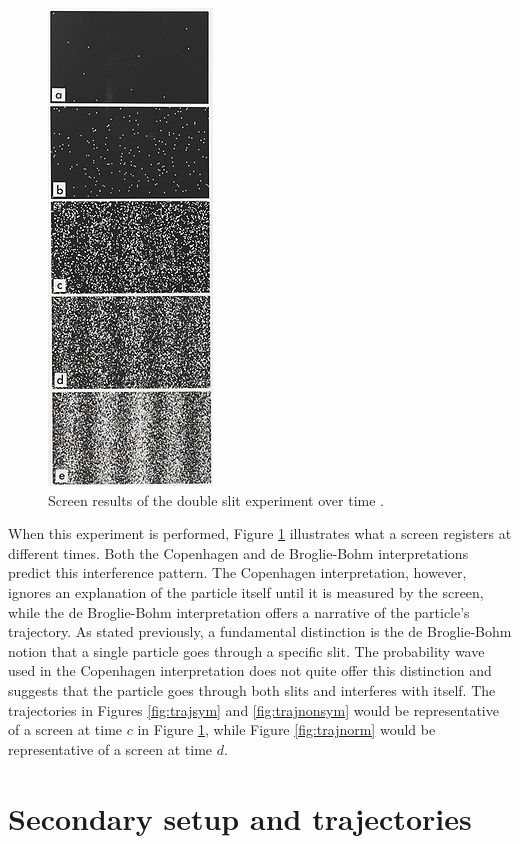 \documentclass[10pt, reqno]{article}
\begin{document}
  \begin{figure}
    \centerline{\includegraphics[scale=4.5]{./imgs/double-slit-results.jpg}}
    \caption{
    Screen results of the double slit experiment over time \cite{wiki}.
    }
    \label{fig:double-slit-results}
  \end{figure}

  When this experiment is performed, Figure \ref{fig:double-slit-results} illustrates what a screen registers at different times.
  Both the Copenhagen and de Broglie-Bohm interpretations predict this interference pattern.
  The Copenhagen interpretation, however, ignores an explanation of the particle itself until it is measured by the screen, 
    while the de Broglie-Bohm interpretation offers a narrative of the particle's trajectory.
  As stated previously, a fundamental distinction is the de Broglie-Bohm notion that a single particle goes through a specific slit.
  The probability wave used in the Copenhagen interpretation does not quite offer this distinction and
    suggests that the particle goes through both slits and interferes with itself.
  The trajectories in Figures \ref{fig:trajsym} and \ref{fig:trajnonsym} would be representative of a screen at time $c$ in Figure \ref{fig:double-slit-results}, 
    while Figure \ref{fig:trajnorm} would be representative of a screen at time $d$.

\section{Secondary setup and trajectories}
\end{document}
